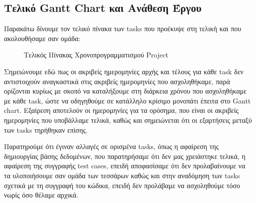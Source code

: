 \documentclass[12pt,a4paper]{article}
\begin{document}
\subsection{Τελικό Gantt Chart και Ανάθεση Έργου}
Παρακάτω δίνουμε τον τελικό πίνακα των tasks που προέκυψε στη τελική και που ακολουθήσαμε σαν ομάδα:

\begin{figure}[H]
	\caption{Τελικός Πίνακας Χρονοπρογραμματισμού Project}
	\label{Τελικός Πίνακας Χρονοπρογραμματισμού Project}
\end{figure}

Σημειώνουμε εδώ πως οι ακριβείς ημερομηνίες αρχής και τέλους για κάθε task δεν αντιστοιχούν αναγκαστικά στις ακριβείς ημερομηνίες που ασχοληθήκαμε, παρά ορίζονται κυρίως με σκοπό να καταλήξουμε στη διάρκεια χρόνου που ασχοληθήκαμε με κάθε task, ώστε να οδηγηθούμε σε κατάλληλο κρίσιμο μονοπάτι έπειτα στο Gantt chart. Εξαίρεση αποτελούν οι ημερομηνίες για τα ορόσημα, που είναι οι ακριβείς ημερομηνίες που υποβάλλαμε τελικά, καθώς και σημειώνεται ότι οι εξαρτήσεις μεταξύ των tasks τηρήθηκαν επίσης.

Παρατηρούμε ότι έγιναν αλλαγές σε ορισμένα tasks, όπως η αφαίρεση της δημιουργίας βάσης δεδομένων, που παρατηρήσαμε ότι δεν μας χρειάστηκε τελικά, η αφαίρεση της συγγραφής test cases, επειδή αποφασίσαμε ότι δεν προλαβαίνουμε να τα υλοποιήσουμε σαν ομάδα των τεσσάρων καθώς και στην αναδόμηση των tasks σχετικά με τη συγγραφή του κώδικα, επειδή δεν προλάβαμε να ασχοληθούμε τόσο νωρίς όσο θέλαμε αρχικά. 
\end{document}
